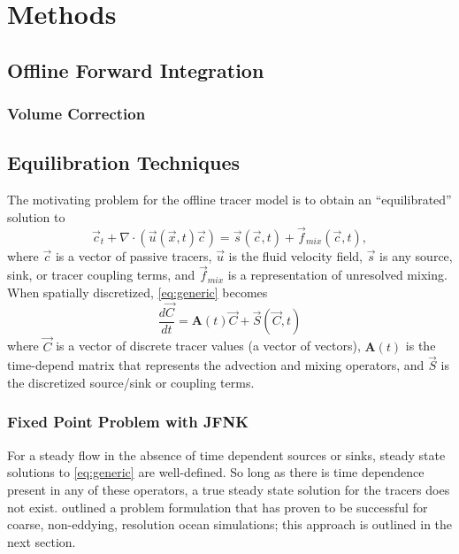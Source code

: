 \documentclass{softwaremanual}
\begin{document}
\chapter{Methods}

\section{Offline Forward Integration}

\subsection{Volume Correction}

\section{Equilibration Techniques}
The motivating problem for the offline tracer model is to obtain an ``equilibrated'' solution to
\begin{equation}
  \vec{c}_t + \nabla \cdot( \vec{u}(\vec{x},t) \vec{c} ) = \vec{s}(\vec{c},t) + \vec{f}_{mix}(\vec{c},t), \label{eq:generic}
\end{equation}
where $\vec{c}$ is a vector of passive tracers, $\vec{u}$ is the fluid velocity field, $\vec{s}$ is any source, sink, or tracer coupling terms, and $\vec{f}_{mix}$ is a representation of unresolved mixing. When spatially discretized, \eqref{eq:generic} becomes
 \begin{equation}
 \frac{d\vec{C}}{dt} = \boldsymbol{A}(t) \vec{C} + \vec{S}(\vec{C},t) \label{eq:tracerProblem}
 \end{equation}
 where $\vec{C}$ is a vector of discrete tracer values (a vector of vectors), $\boldsymbol{A}(t)$ is the time-depend matrix that represents the advection and mixing operators, and $\vec{S}$ is the discretized source/sink or coupling terms.

\subsection{Fixed Point Problem with JFNK}
 For a steady flow in the absence of time dependent sources or sinks, steady state solutions to \eqref{eq:generic} are well-defined. So long as there is time dependence present in any of these operators, a true steady state solution for the tracers does not exist. \citet{Primeau2005} outlined a problem formulation that has proven to be successful for coarse, non-eddying, resolution ocean simulations; this approach is outlined in the next section.
\end{document}
